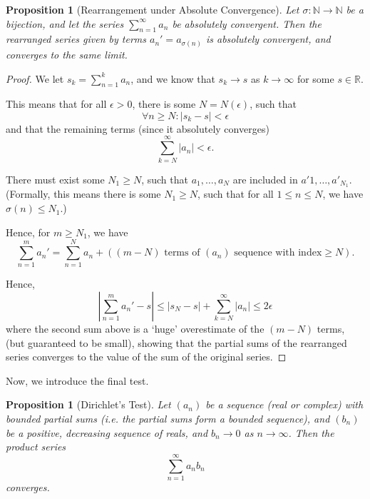 \documentclass[11pt]{article}
\numberwithin{equation}{section}
\newtheorem{proposition}[theorem]{Proposition}
\theoremstyle{definition}
\theoremstyle{remark}
\newcommand{\pqty}[1]{\left(#1\right)}
\newcommand{\abs}[1]{\left|#1\right|}
\newcommand{\functiondomain}[3]{#1:#2\to #3}
\newcommand{\RR}{\mathbb R}
\newcommand{\NN}{\mathbb N}
\begin{document}
\begin{proposition}[Rearrangement under Absolute Convergence]\label{analysis-unit-0060}
    \label{prop:ser-rearrangement-absolute-convergence}%
    Let \(\functiondomain{\sigma}{\NN}{\NN}\) be a bijection, and let the series \(\sum_{n=1}^{\infty} a_n\) be absolutely convergent. Then the rearranged series given by terms \(a_n' = a_{\sigma\pqty{n}}\) is absolutely convergent, and converges to the same limit.
\end{proposition}

\begin{proof}
    We let \(s_k = \sum_{n = 1}^{k} a_n\), and we know that \(s_k \to s\) as \(k \to \infty\) for some \(s \in \RR\).

    This means that for all \(\epsilon > 0\), there is some \(N = N\pqty{\epsilon}\), such that
    \[
        \forall n \geq N: \abs{s_k - s} < \epsilon
    \]
    and that the remaining terms (since it absolutely converges)
    \[
        \sum_{k = N}^{\infty} \abs{a_n} < \epsilon.
    \]

    There must exist some \(N_1 \geq N\), such that \(a_1, \ldots, a_N\) are included in \(a'1, \ldots, a'_{N_1}\). (Formally, this means there is some \(N_1 \geq N\), such that for all \(1 \leq n \leq N\), we have \(\sigma\pqty{n} \leq N_1\).)

    Hence, for \(m \geq N_1\), we have
    \[
        \sum_{n = 1}^{m} a_n' = \sum_{n = 1}^{N} a_n + \pqty{\pqty{m - N} \text{ terms of }\pqty{a_n}\text{ sequence with index}\geq N}.
    \]

    Hence,
    \[
        \abs{\sum_{n = 1}^{m} a_n' - s} \leq \abs{s_N - s} + \sum_{k = N}^{\infty} \abs{a_n} \leq 2\epsilon
    \]
    where the second sum above is a `huge' overestimate of the \(\pqty{m - N}\) terms, (but guaranteed to be small), showing that the partial sums of the rearranged series converges to the value of the sum of the original series.
\end{proof}

Now, we introduce the final test.

\begin{proposition}[Dirichlet's Test]\label{analysis-unit-0061}
    \label{prop:ser-test-dirichlet}%
    Let \(\pqty{a_n}\) be a sequence (real or complex) with bounded partial sums (i.e. the partial sums form a bounded sequence), and \(\pqty{b_n}\) be a positive, decreasing sequence of reals, and \(b_n \to 0\) as \(n \to \infty\). Then the product series
    \[
        \sum_{n = 1}^{\infty} a_n b_n
    \]
    converges.
\end{proposition}
\end{document}
